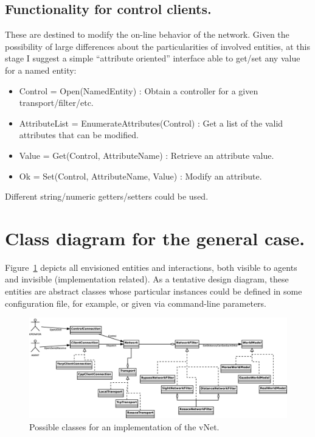 \documentclass[a4paper,11pt]{article}
\begin{document}
\subsection{Functionality for control clients.}

These are destined to modify the on-line behavior of the network. Given the
possibility of large differences about the particularities of involved
entities, at this stage I suggest a simple ``attribute oriented'' interface
able to get/set any value for a named entity:

\begin{itemize}
    \item Control = Open(NamedEntity) : Obtain a controller for a given
transport/filter/etc.
    \item AttributeList = EnumerateAttributes(Control) : Get a list of the
valid attributes that can be modified.
    \item Value = Get(Control, AttributeName) : Retrieve an attribute value.
    \item Ok = Set(Control, AttributeName, Value) : Modify an attribute.
\end{itemize}

Different string/numeric getters/setters could be used.

\section{Class diagram for the general case.}

Figure~\ref{fig:classes} depicts all envisioned entities and interactions, both visible to agents and invisible (implementation related). As a tentative design diagram, these entities are abstract classes whose particular instances could be defined in some configuration file, for example, or given via command-line parameters.

\begin{figure}
\begin{center}
\includegraphics[width=0.999\columnwidth]{figures/classes}
\end{center}
\caption{Possible classes for an implementation of the vNet.}
\label{fig:classes}
\end{figure}

\nocite{Naicken2007}


\end{document}
